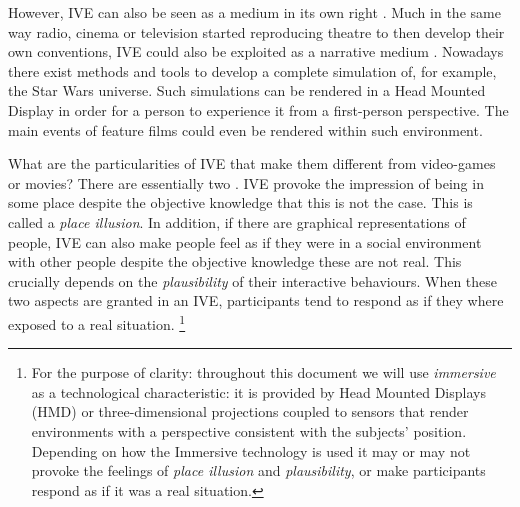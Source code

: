 \documentclass[
		twoside,openright,titlepage,numbers=noenddot,manychapters,
		headinclude,%
                footinclude=false,cleardoublepage=empty,
                BCOR=5mm,
		fontsize=11pt, %
                 enabledeprecatedfontcommands]{scrreprt}
\begin{document}
However, IVE can also be seen as a medium in its own right \cite[]{slater2009}.  Much in the same way radio, cinema or television started reproducing theatre to then develop their own conventions, IVE could also be exploited as a narrative medium \cite[]{disney_alladin}. Nowadays there exist methods and tools to develop a complete simulation of, for example, the Star Wars universe. Such simulations can be rendered in a Head Mounted Display in order for a person to experience it from a first-person perspective. The main events of feature films could even be rendered within such environment. 

What are the particularities of IVE that make them different from video-games or movies? There are essentially two \cite[]{slater2009}. IVE provoke the impression of being in some place despite the objective knowledge that this is not the case. This is called a \emph{place illusion}. In addition, if there are graphical representations of people, IVE can also make people feel as if they were in a social environment with other people despite the objective knowledge these are not real. This crucially depends on the \emph{plausibility} of their interactive behaviours.   When these two aspects are granted in an IVE, participants tend to respond as if they where exposed to a real situation. 
\footnote{For the purpose of clarity: throughout this document we will use \emph{immersive} as a technological characteristic: it is provided by Head Mounted Displays (HMD) or three-dimensional projections coupled to sensors that render environments with a perspective consistent with the subjects' position. Depending on how the Immersive technology is used it may or may not provoke the feelings of \emph{place illusion} and \emph{plausibility}, or make participants respond as if it was a real situation.}
\end{document}
